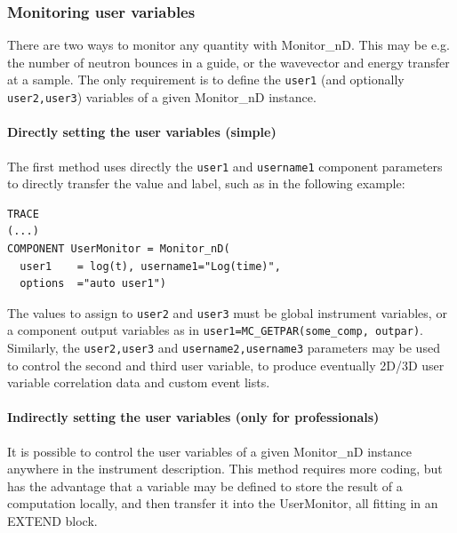 \subsubsection{Monitoring user variables}
\label{s:monnd:user}

There are two ways to monitor any quantity with Monitor\_nD. This may be e.g. the number of neutron bounces in a guide, or the wavevector and energy transfer at a sample. The only requirement is to define the \verb+user1+ (and optionally \verb+user2,user3+) variables of a given Monitor\_nD instance.

\paragraph{Directly setting the user variables (simple)}

The first method uses directly the \verb+user1+ and \verb+username1+ component parameters to directly transfer the value and label, such as in the following example:
\begin{lstlisting}
TRACE
(...)
COMPONENT UserMonitor = Monitor_nD(
  user1    = log(t), username1="Log(time)",
  options  ="auto user1")
\end{lstlisting}
The values to assign to \verb+user2+ and \verb+user3+ must be global instrument variables, or a component output variables as in \verb+user1=MC_GETPAR(some_comp, outpar)+.
Similarly, the \verb+user2,user3+ and \verb+username2,username3+ parameters may be used to control the second and third user variable, to produce eventually 2D/3D user variable correlation data and custom event lists.

\paragraph{Indirectly setting the user variables (only for professionals)}

It is possible to control the user variables of a given Monitor\_nD instance anywhere in the instrument description. This method requires more coding, but has the advantage that a variable may be defined to store the result of a computation locally, and then transfer it into the UserMonitor, all fitting in an EXTEND block.

